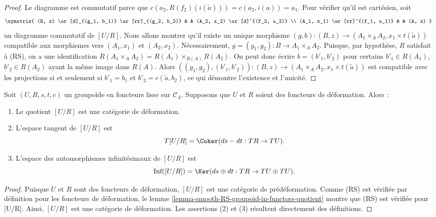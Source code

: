 \begin{proof}
\medskip\noindent
Le diagramme est commutatif parce que
$c(a_2, R(f_2)(i(\widetilde{a}))) = c(a_2, i(a)) = a_1$.
Pour vérifier qu'il est cartésien, soit
$$
\xymatrix{
(B, z) \ar[d]_{(g_1, b_1)} \ar[rr]_{(g_2, b_2)} & & (A_2, x_2)
\ar[d]^{(f_2, a_2)} \\
(A_1, x_1) \ar[rr]^{(f_1, a_1)} & & (A, x)
}
$$
un diagramme commutatif de $[U/R]$. Nous allons montrer qu'il existe un unique
morphisme
$(g, b) : (B, z) \to (A_1 \times_A A_2, x_1 \times t(\widetilde{a}))$
compatible aux morphismes vers $(A_1, x_1)$ et $(A_2, x_2)$. Nécessairement,
$g = (g_1, g_2) : B \to A_1 \times_A A_2$. Puisque, par hypothèse, $R$
satisfait à (RS), on a une identification
$R(A_1 \times_A A_2) = R(A_1) \times_{R(A)} R(A_2)$. On peut donc écrire
$b = (b'_1, b'_2)$ pour certains $b'_1 \in R(A_1)$, $b'_2 \in R(A_2)$ ayant
la même image dans $R(A)$. Alors
$((g_1, g_2), (b'_1, b'_2)) : (B, z) \to
(A_1 \times_A A_2, x_1 \times t(\widetilde{a}))$
est compatible avec les projections si et seulement si $b'_1 = b_1$ et
$b'_2 = c(\widetilde{a}, b_2)$, ce qui démontre l'existence et l'unicité.
\end{proof}

\begin{lemma}
\label{lemma-deformation-groupoid-quotient}
Soit $(U, R, s, t, c)$ un groupoïde en foncteurs lisse sur
$\mathcal{C}_\Lambda$. Supposons que $U$ et $R$ soient des foncteurs de
déformation. Alors :
\begin{enumerate}
\item Le quotient $[U/R]$ est une catégorie de déformation.
\item L'espace tangent de $[U/R]$ est
$$
T[U/R] = \Coker(ds-dt: TR \to TU).
$$
\item L'espace des automorphismes infinitésimaux de $[U/R]$ est
$$
\text{Inf}([U/R]) =
\Ker(ds \oplus dt : TR \to TU \oplus TU).
$$
\end{enumerate}
\end{lemma}

\begin{proof}
Puisque $U$ et $R$ sont des foncteurs de déformation, $[U/R]$ est une
catégorie de prédéformation. Comme (RS) est vérifiée par définition pour les
foncteurs de déformation, le lemme
\ref{lemma-smooth-RS-groupoid-in-functors-quotient} montre que (RS) est
vérifiée pour [U/R]. Ainsi, $[U/R]$ est une catégorie de déformation. Les
assertions (2) et (3) résultent directement des définitions.
\end{proof}







